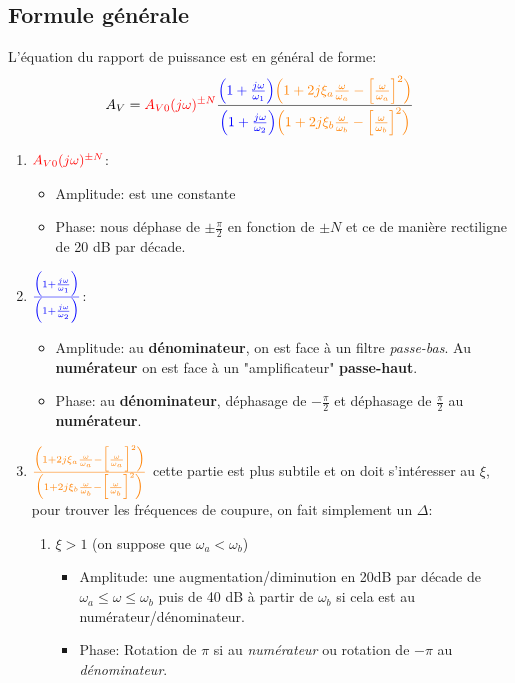 \documentclass{report}
\begin{document}
\subsection{Formule générale}
L'équation du rapport de puissance est en général de forme:
\begin{equation}
A_V = \textcolor{red}{A_{V0}(j\omega)^{\pm N}}\frac{\textcolor{blue}{\Bigl(1 + \frac{j\omega}{\omega_1}\Bigl)} \textcolor{orange}{\Bigl( 1 + 2 j \xi_a \frac{\omega}{\omega_a} - \Bigl[ \frac{\omega}{\omega_a}\Bigl]^2 \Bigl)}}{\textcolor{blue}{\Bigl(1 + \frac{j\omega}{\omega_2}\Bigl)} \textcolor{orange}{\Bigl( 1 + 2 j \xi_b \frac{\omega}{\omega_b} - \Bigl[ \frac{\omega}{\omega_b}\Bigl]^2 \Bigl)}}
\end{equation}
\newpage
\begin{enumerate}
\item $\textcolor{red}{A_{V0}(j\omega)^{\pm N}}$:
	\begin{itemize}
	\item Amplitude: est une constante
	\item Phase: nous déphase de $\pm \frac{\pi}{2}$ en fonction de $\pm N$ et ce de manière rectiligne de 20 dB par décade.
	\end{itemize}
\item $\textcolor{blue}{\frac{\textcolor{blue}{\Bigl(1 + \frac{j\omega}{\omega_1}\Bigl)}}{\textcolor{blue}{\Bigl(1 + \frac{j\omega}{\omega_2}\Bigl)}}}$:
	\begin{itemize}
	\item Amplitude: au \textbf{dénominateur}, on est face à un filtre \textit{passe-bas}. Au \textbf{numérateur} on est face à un "amplificateur" \textbf{passe-haut}.
	\item Phase: au \textbf{dénominateur}, déphasage de $-\frac{\pi}{2}$ et déphasage de $\frac{\pi}{2}$ au \textbf{numérateur}.
	\end{itemize}
\item $\textcolor{orange}{\frac{\textcolor{orange}{\Bigl( 1 + 2 j \xi_a \frac{\omega}{\omega_a} - \Bigl[ \frac{\omega}{\omega_a}\Bigl]^2 \Bigl)}}{\textcolor{orange}{\Bigl( 1 + 2 j \xi_b \frac{\omega}{\omega_b} - \Bigl[ \frac{\omega}{\omega_b}\Bigl]^2 \Bigl)}}}$ cette partie est plus subtile et on doit s'intéresser au $\xi$, pour trouver les fréquences de coupure, on fait simplement un $\Delta$:
	\begin{enumerate}
		\item $\xi >  1$ (on suppose que $\omega_a < \omega_b$)
		\begin{itemize}
			\item Amplitude: une augmentation/diminution en 20dB par décade de $\omega_a \leq \omega \leq \omega_b$ puis de 40 dB à partir de $\omega_b$ si cela est au numérateur/dénominateur.
			\item Phase: Rotation de $\pi$ si au \textit{numérateur} ou rotation de $-\pi$ au \textit{dénominateur}.
		\end{itemize}
		

\end{enumerate}
\end{enumerate}
\end{document}
